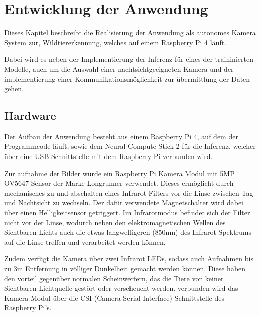 
\chapter{Entwicklung der Anwendung}\label{kap:application}

Dieses Kapitel beschreibt die Realisierung der Anwendung 
als autonomes Kamera System zur, 
Wildtiererkennung, welches auf einem Raspberry Pi 4 läuft.

Dabei wird es neben der Implementierung der Inferenz für eines der 
traininierten Modelle, auch um die Auswahl einer 
nachtsichtgeeigneten Kamera und der implementierung 
einer Kommunikationsmöglichkeit zur übermittlung 
der Daten gehen.



\section{Hardware}\label{sec:aufbau}


Der Aufbau der Anwendung besteht aus einem Raspberry Pi 4, auf dem 
der Programmcode läuft, sowie dem Neural Compute Stick 2
für die Inferenz, welcher über eine USB Schnittstelle
mit dem Raspberry Pi verbunden wird.

Zur aufnahme der Bilder wurde ein Raspberry Pi Kamera Modul mit 
5MP OV5647 Sensor der Marke Longrunner verwendet.
Dieses ermöglicht durch mechanisches zu und abschalten eines Infrarot 
Filters vor die Linse zwischen Tag und Nachtsicht zu wechseln.
Der dafür verwendete Magnetschalter wird dabei über einen 
Helligkeitsensor getriggert.
Im Infrarotmodus befindet sich der Filter nicht 
vor der Linse, wodurch neben den elektromagnetischen 
Wellen des Sichtbaren Lichts auch die etwas langwelligeren 
(850nm) des Infrarot Spektrums auf die Linse treffen und 
verarbeitet werden können.

Zudem verfügt die Kamera über zwei Infrarot LEDs, 
sodass auch Aufnahmen bis zu 3m Entfernung
in völliger Dunkelheit gemacht werden können. Diese haben 
den vorteil gegenüber normalen Scheinwerfern, 
das die Tiere von keiner Sichtbaren Lichtquelle 
gestört oder verscheucht werden.
verbunden wird das Kamera Modul über die CSI 
(Camera Serial Interface) 
Schnittstelle des Raspberry Pi's.
\vspace{1cm}



